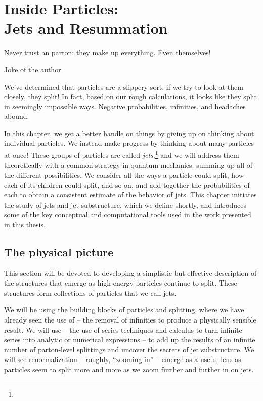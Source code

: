 \chapter[Inside Particles: Jets and Resummation]{Inside Particles:\\Jets and Resummation}
\label{chap:jets}

\epigraph{Never trust an parton: they make up everything. Even themselves!}{Joke of the author}


We've determined that particles are a slippery sort:
%
if we try to look at them closely, they split!
%
In fact, based on our rough calculations, it looks like they split in seemingly impossible ways.
%
Negative probabilities, infinities, and headaches abound.

In this chapter, we get a better handle on things by giving up on thinking about individual particles.
%
We instead make progress by thinking about many particles at once!
%
These groups of particles are called \emph{jets},\footnote{} and we will address them theoretically with a common strategy in quantum mechanics:
%
summing up all of the different possibilities.
%
We consider all the ways a particle could split, how each of its children could split, and so on, and add together the probabilities of each to obtain a consistent estimate of the behavior of jets.
%
This chapter initiates the study of jets and jet substructure, which we define shortly, and introduces some of the key conceptual and computational tools used in the work presented in this thesis.



\section{The physical picture}

This section will be devoted to developing a simplistic but effective description of the structures that emerge as high-energy particles continue to split.
%
These structures form collections of particles that we call jets.

We will be using the building blocks of particles and splitting, where we have already seen the use of  -- the removal of infinities to produce a physically sensible result.
%
We will use  -- the use of series techniques and calculus to turn infinite series into analytic or numerical expressions -- to add up the results of an infinite number of parton-level splittings and uncover the secrets of jet substructure.
%
We will see \underline{renormalization} -- roughly, ``zooming in'' -- emerge as a useful lens as particles seem to split more and more as we zoom further and further in on jets.



